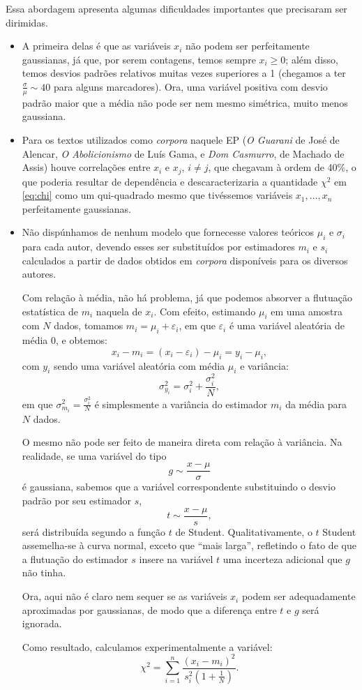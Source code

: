 \documentclass[10pt,a4paper,onecolumn]{article}
\theoremstyle{definition}
\theoremstyle{remark}
\begin{document}
Essa abordagem apresenta algumas dificuldades importantes que precisaram ser dirimidas. 
\begin{itemize}
	\item A primeira delas é que as variáveis $x_i$ não podem ser perfeitamente gaussianas, já que, por serem contagens, temos sempre $x_i \geqslant 0$; além disso, temos desvios padrões relativos muitas vezes superiores a 1 (chegamos a ter $\frac{\sigma}{\mu} \sim 40$ para alguns marcadores). Ora, uma variável positiva com desvio padrão maior que a média não pode ser nem mesmo simétrica, muito menos gaussiana.
	\item Para os textos utilizados como \emph{corpora} naquele EP (\emph{O Guarani} de José de Alencar, \emph{O Abolicionismo} de Luís Gama, e \emph{Dom Casmurro}, de Machado de Assis) houve correlações entre $x_i$ e $x_j$, $i \neq j$, que chegavam à ordem de 40\%, o que poderia resultar de dependência e descaracterizaria a quantidade $\chi^2$ em \eqref{eq:chi} como um qui-quadrado mesmo que tivéssemos variáveis $x_1,\dots,x_n$ perfeitamente gaussianas.
	\item Não dispúnhamos de nenhum modelo que fornecesse valores teóricos $\mu_i$ e $\sigma_i$ para cada autor, devendo esses ser substituídos por estimadores $m_i$ e $s_i$ calculados a partir de dados obtidos em \emph{corpora} disponíveis para os diversos autores.
	
	 Com relação à média, não há problema, já que podemos absorver a flutuação estatística de $m_i$ naquela de $x_i$. Com efeito, estimando $\mu_i$ em uma amostra com $N$ dados, tomamos $m_i = \mu_i + \varepsilon_i$, em que $\varepsilon_i$ é uma variável aleatória de média $0$, e obtemos:
	$$x_i - m_i = (x_i - \varepsilon_i) - \mu_i = y_i - \mu_i,$$
	com $y_i$ sendo uma variável aleatória com média $\mu_i$ e variância:
	$$\sigma^2_{y_i} = \sigma_i^2 + \frac{\sigma_i^2}{N},$$
	em que $\sigma^2_{m_i} = \frac{\sigma_i^2}{N}$ é simplesmente a variância do estimador $m_i$ da média para $N$ dados. 
	
	O mesmo não pode ser feito de maneira direta com relação à variância. Na realidade, se uma variável do tipo 
	$$g \sim \frac{x-\mu}{\sigma}$$
	é gaussiana, sabemos que a variável correspondente substituindo o desvio padrão por seu estimador $s$,
	$$t \sim \frac{x-\mu}{s},$$
	será distribuída segundo a função $t$ de Student. Qualitativamente, o $t$ Student assemelha-se à curva normal, exceto que ``mais larga'', refletindo o fato de que a flutuação do estimador $s$ insere na variável $t$ uma incerteza adicional que $g$ não tinha.
	
	Ora, aqui não é claro nem sequer se as variáveis $x_i$ podem ser adequadamente aproximadas por gaussianas, de modo que a diferença entre $t$ e $g$ será ignorada.
	
	Como resultado, calculamos experimentalmente a variável:
	\begin{equation}\label{eq:meuqui}
		\chi^2 = \sum_{i = 1}^n \frac{(x_i-m_i)^2}{s_i^2\left(1 + \frac{1}{N}\right)}.
	\end{equation}
\end{itemize}
\end{document}

